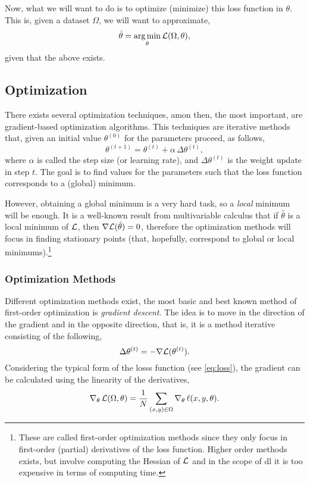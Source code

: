 Now, what we will want to do is to optimize (minimize) this loss function in
\(\theta\). This is, given a dataset \(\Omega\), we will want to approximate,
\begin{equation}
  \hat{\theta} = \operatorname*{arg\,min}_{\theta} \mathcal{L}(\Omega, \theta),
\end{equation}
given that the above exists.


\subsection{Optimization}\label{sec:optimization}

There exists several optimization techniques, amon then, the most important,
are gradient-based optimization algorithms. This techniques are iterative
methods that, given an initial value \(\theta^{(0)}\) for the parameters
proceed, as follows,
\begin{equation}
  \theta^{(t + 1)} = \theta^{(t)} + \alpha\,\Delta\theta^{(t)},
\end{equation}
where \(\alpha\) is called the step size (or learning rate), and
\(\Delta\theta^{(t)}\) is the weight update in step \(t\). The goal is to find
values for the parameters such that the loss function corresponds to a (global)
minimum.

However, obtaining a global minimum is a very hard task, so a \emph{local}
minimum will be enough. It is a well-known result from multivariable calculus
that if \(\hat{\theta}\) is a local minimum of \(\mathcal{L}\), then
\(\nabla\mathcal{L}(\hat{\theta}) = 0\), therefore the optimization methods will
focus in finding stationary points (that, hopefully, correspond to global or
local minimums).\footnote{These are called first-order optimization methods
  since they only focus in first-order (partial) derivatives of the loss
  function. Higher order methods exists, but involve computing the Hessian of
  \(\mathcal{L}\) and in the scope of \gls{dl} it is too expensive in terms of
  computing time.}

\subsubsection{Optimization Methods}

Different optimization methods exist, the most basic and best known method of
first-order optimization is \emph{gradient descent}. The idea is to move in the
direction of the gradient and in the opposite direction, that is, it is a
method iterative consisting of the following,
\begin{equation}\label{eq:gd}
  \Delta\theta^{(t)} = - \nabla\mathcal{L}(\theta^{(t)}).
\end{equation}
Considering the typical form of the losss function (see \vref{eq:loss}), the
gradient can be calculated using the linearity of the derivatives,
\begin{equation}\label{eq:nabla-loss}
  \nabla_{\theta}\,\mathcal{L}(\Omega, \theta) =
  \frac{1}{N} \sum_{(x, y) \in \Omega} \nabla_{\theta}\,\ell (x, y, \theta).
\end{equation}

